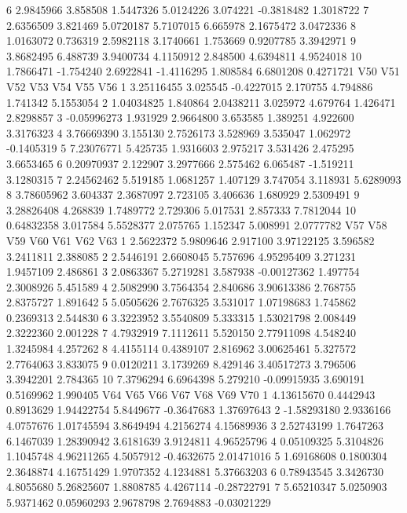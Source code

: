 \documentclass[12pt]{article}
\begin{document}
\begin{Schunk}
\begin{Soutput}
6  2.9845966  3.858508  1.5447326  5.0124226 3.074221 -0.3818482 1.3018722
7  2.6356509  3.821469  5.0720187  5.7107015 6.665978  2.1675472 3.0472336
8  1.0163072  0.736319  2.5982118  3.1740661 1.753669  0.9207785 3.3942971
9  3.8682495  6.488739  3.9400734  4.1150912 2.848500  4.6394811 4.9524018
10 1.7866471 -1.754240  2.6922841 -1.4116295 1.808584  6.6801208 0.4271721
           V50      V51        V52      V53      V54       V55        V56
1   3.25116455 3.025545 -0.4227015 2.170755 4.794886  1.741342  5.1553054
2   1.04034825 1.840864  2.0438211 3.025972 4.679764  1.426471  2.8298857
3  -0.05996273 1.931929  2.9664800 3.653585 1.389251  4.922600  3.3176323
4   3.76669390 3.155130  2.7526173 3.528969 3.535047  1.062972 -0.1405319
5   7.23076771 5.425735  1.9316603 2.975217 3.531426  2.475295  3.6653465
6   0.20970937 2.122907  3.2977666 2.575462 6.065487 -1.519211  3.1280315
7   2.24562462 5.519185  1.0681257 1.407129 3.747054  3.118931  5.6289093
8   3.78605962 3.604337  2.3687097 2.723105 3.406636  1.680929  2.5309491
9   3.28826408 4.268839  1.7489772 2.729306 5.017531  2.857333  7.7812044
10  0.64832358 3.017584  5.5528377 2.075765 1.152347  5.008991  2.0777782
         V57       V58      V59         V60      V61       V62      V63
1  2.5622372 5.9809646 2.917100  3.97122125 3.596582 3.2411811 2.388085
2  2.5446191 2.6608045 5.757696  4.95295409 3.271231 1.9457109 2.486861
3  2.0863367 5.2719281 3.587938 -0.00127362 1.497754 2.3008926 5.451589
4  2.5082990 3.7564354 2.840686  3.90613386 2.768755 2.8375727 1.891642
5  5.0505626 2.7676325 3.531017  1.07198683 1.745862 0.2369313 2.544830
6  3.3223952 3.5540809 5.333315  1.53021798 2.008449 2.3222360 2.001228
7  4.7932919 7.1112611 5.520150  2.77911098 4.548240 1.3245984 4.257262
8  4.4155114 0.4389107 2.816962  3.00625461 5.327572 2.7764063 3.833075
9  0.0120211 3.1739269 8.429146  3.40517273 3.796506 3.3942201 2.784365
10 7.3796294 6.6964398 5.279210 -0.09915935 3.690191 0.5169962 1.990405
           V64       V65       V66        V67       V68        V69         V70
1   4.13615670 0.4442943 0.8913629 1.94422754 5.8449677 -0.3647683  1.37697643
2  -1.58293180 2.9336166 4.0757676 1.01745594 3.8649494  4.2156274  4.15689936
3   2.52743199 1.7647263 6.1467039 1.28390942 3.6181639  3.9124811  4.96525796
4   0.05109325 5.3104826 1.1045748 4.96211265 4.5057912 -0.4632675  2.01471016
5   1.69168608 0.1800304 2.3648874 4.16751429 1.9707352  4.1234881  5.37663203
6   0.78943545 3.3426730 4.8055680 5.26825607 1.8808785  4.4267114 -0.28722791
7   5.65210347 5.0250903 5.9371462 0.05960293 2.9678798  2.7694883 -0.03021229

\end{Soutput}
\end{Schunk}
\end{document}

